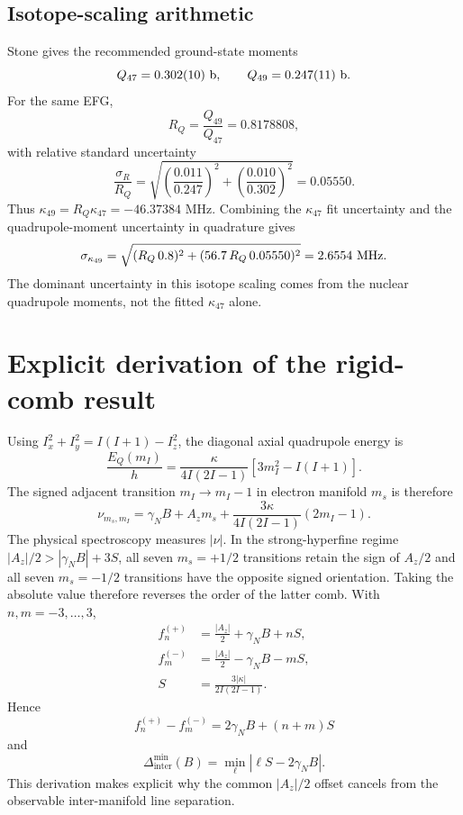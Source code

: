 \documentclass[11pt]{article}
\newcommand{\DeltaInter}{\Delta_{\mathrm{inter}}^{\min}}
\begin{document}
\subsection{Isotope-scaling arithmetic}
Stone \cite{stone2016} gives the recommended ground-state moments
\begin{equation}
Q_{47}=0.302(10)\ {\rm b},\qquad Q_{49}=0.247(11)\ {\rm b}.
\end{equation}
For the same EFG,
\begin{equation}
R_Q=\frac{Q_{49}}{Q_{47}}=0.8178808,
\end{equation}
with relative standard uncertainty
\begin{equation}
\frac{\sigma_R}{R_Q}=\sqrt{\left(\frac{0.011}{0.247}\right)^2+\left(\frac{0.010}{0.302}\right)^2}=0.05550.
\end{equation}
Thus $\kappa_{49}=R_Q\kappa_{47}=-46.37384$ MHz. Combining the $\kappa_{47}$ fit uncertainty and the quadrupole-moment uncertainty in quadrature gives
\begin{equation}
\sigma_{\kappa_{49}}=\sqrt{(R_Q\,0.8)^2+(56.7\,R_Q\,0.05550)^2}=2.6554\ {\rm MHz}.
\end{equation}
The dominant uncertainty in this isotope scaling comes from the nuclear quadrupole moments, not the fitted $\kappa_{47}$ alone.

\section{Explicit derivation of the rigid-comb result}
Using $I_x^2+I_y^2=I(I+1)-I_z^2$, the diagonal axial quadrupole energy is
\begin{equation}
\frac{E_Q(m_I)}{h}=\frac{\kappa}{4I(2I-1)}\left[3m_I^2-I(I+1)\right].
\end{equation}
The signed adjacent transition $m_I\rightarrow m_I-1$ in electron manifold $m_s$ is therefore
\begin{equation}
\nu_{m_s,m_I}=\gamma_NB+A_zm_s+\frac{3\kappa}{4I(2I-1)}(2m_I-1).
\end{equation}
The physical spectroscopy measures $|\nu|$. In the strong-hyperfine regime $|A_z|/2>|\gamma_NB|+3S$, all seven $m_s=+1/2$ transitions retain the sign of $A_z/2$ and all seven $m_s=-1/2$ transitions have the opposite signed orientation. Taking the absolute value therefore reverses the order of the latter comb. With $n,m=-3,\ldots,3$,
\begin{align}
f_n^{(+)}&=\frac{|A_z|}{2}+\gamma_NB+nS,\\
f_m^{(-)}&=\frac{|A_z|}{2}-\gamma_NB-mS,\\
S&=\frac{3|\kappa|}{2I(2I-1)}.
\end{align}
Hence
\begin{equation}
f_n^{(+)}-f_m^{(-)}=2\gamma_NB+(n+m)S
\end{equation}
and
\begin{equation}
\DeltaInter(B)=\min_{\ell}|\ell S-2\gamma_NB|.
\end{equation}
This derivation makes explicit why the common $|A_z|/2$ offset cancels from the observable inter-manifold line separation.
\end{document}
